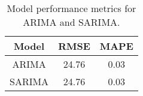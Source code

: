 \begin{table}[H]
    \centering
    \caption{Model performance metrics for ARIMA and SARIMA.}
    \label{tab:model_performance_metrics}
    \begin{tabular}{|c|c|c|}
        \hline
        Model  & RMSE  & MAPE \\
        \hline
        ARIMA  & 24.76 & 0.03 \\
        SARIMA & 24.76 & 0.03 \\
        \hline
    \end{tabular}
\end{table}
